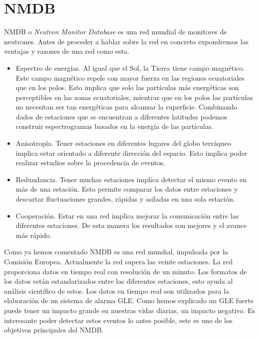 \section{NMDB}
	NMDB\cite{NMDB2011} o \emph{Neutron Monitor Database} es una red mundial de monitores de neutrones. Antes de proceder a hablar sobre la red
	en concreto expondremos las ventajas y razones de una red como esta.
	\begin{itemize}
		\item 	Espectro de energías. Al igual que el Sol, la Tierra tiene campo magnético. Este campo magnético repele con mayor fuerza en
		  	las regiones ecuatoriales que en los polos. Esto implica que solo las partículas más energéticas son perceptibles en las
			zonas ecuatoriales, mientras que en los polos las partículas no necesitan ser tan energéticas para alcanzar la superficie.
			Combinando dados de estaciones que se encuentran a diferentes latitudes podemos construir espectrogramas basados en la energía
			de las partículas.
		\item 	Anisotropía. Tener estaciones en diferentes lugares del globo terráqueo implica estar orientado a diferente dirección del
		  	espacio. Esto implica poder realizar estudios sobre la procedencia de eventos.
		\item 	Redundancia. Tener muchas estaciones implica detectar el mismo evento en más de una estación. Esto permite comparar los datos
		  	entre estaciones y descartar fluctuaciones grandes, rápidas y asiladas en una sola estación.
		\item 	Cooperación. Estar en una red implica mejorar la comunicación entre las diferentes estaciones. De esta manera los resultados
		  	son mejores y el avance más rápido. 
	\end{itemize}
	\par
	Como ya hemos comentado NMDB es una red mundial, impulsada por la Comisión Europea. Actualmente la red supera las veinte estaciones. La red
	proporciona datos en tiempo real con resolución de un minuto. Los formatos de los datos están estandarizados entre las diferentes estaciones,
	esto ayuda al análisis científico de estos. Los datos en tiempo real son utilizados para la elaboración de un sistema de alarma
	GLE\cite{GleAlarm}. Como hemos explicado un GLE fuerte puede tener un impacto grande en nuestras vidas diarias, un impacto negativo. Es
	interesante poder detectar estos eventos lo antes posible, este es uno de los objetivos principales del NMDB. 

